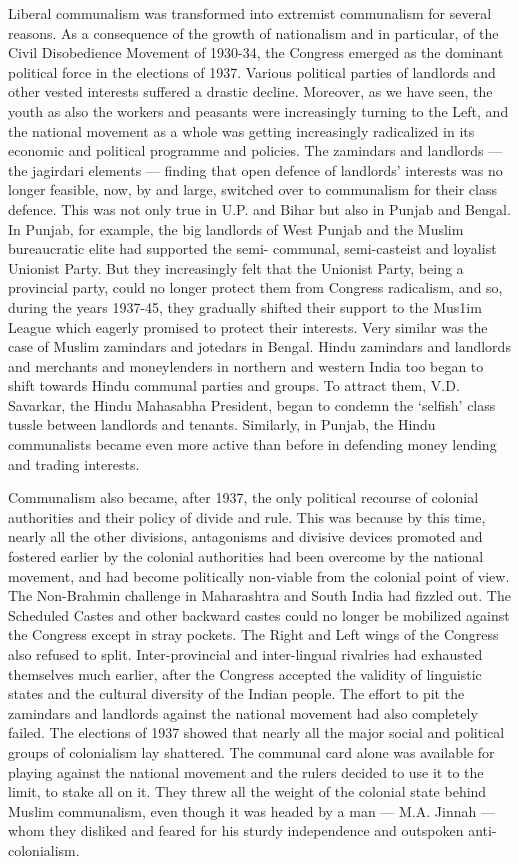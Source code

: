 Liberal communalism was transformed into extremist communalism for several reasons. As a consequence of the growth of nationalism and in particular, of the Civil Disobedience Movement of 1930-34, the Congress emerged as the dominant political force in the elections of 1937. Various political parties of landlords and other vested interests suffered a drastic decline. Moreover, as we have seen, the youth as also the workers and peasants were increasingly turning to the Left, and the national movement as a whole was getting increasingly radicalized in its economic and political programme and policies. The zamindars and landlords — the jagirdari elements — finding that open defence of landlords’ interests was no longer feasible, now, by and large, switched over to communalism for their class defence. This was not only true in U.P. and Bihar but also in Punjab and Bengal. In Punjab, for example, the big landlords of West Punjab and the Muslim bureaucratic elite had supported the semi- communal, semi-casteist and loyalist Unionist Party. But they increasingly felt that the Unionist Party, being a provincial party, could no longer protect them from Congress radicalism, and so, during the years 1937-45, they gradually shifted their support to the Mus1im League which eagerly promised to protect their interests. Very similar was the case of Muslim zamindars and jotedars in Bengal. Hindu zamindars and landlords and merchants and moneylenders in northern and western India too began to shift towards Hindu communal parties and groups. To attract them, V.D. Savarkar, the Hindu Mahasabha President, began to condemn the ‘selfish’ class tussle between landlords and tenants. Similarly, in Punjab, the Hindu communalists became even more active than before in defending money lending and trading interests. 

Communalism also became, after 1937, the only political recourse of colonial authorities and their policy of divide and rule. This was because by this time, nearly all the other divisions, antagonisms and divisive devices promoted and fostered earlier by the colonial authorities had been overcome by the national movement, and had become politically non-viable from the colonial point of view. The Non-Brahmin challenge in Maharashtra and South India had fizzled out. The Scheduled Castes and other backward castes could no longer be mobilized against the Congress except in stray pockets. The Right and Left wings of the Congress also refused to split. Inter-provincial and inter-lingual rivalries had exhausted themselves much earlier, after the Congress accepted the validity of linguistic states and the cultural diversity of the Indian people. The effort to pit the zamindars and landlords against the national movement had also completely failed. The elections of 1937 showed that nearly all the major social and political groups of colonialism lay shattered. The communal card alone was available for playing against the national movement and the rulers decided to use it to the limit, to stake all on it. They threw all the weight of the colonial state behind Muslim communalism, even though it was headed by a man — M.A. Jinnah — whom they disliked and feared for his sturdy independence and outspoken anti-colonialism. 

